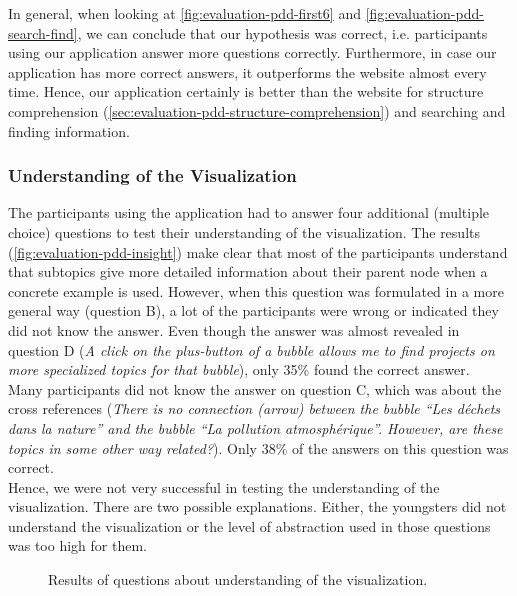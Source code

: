 In general, when looking at \autoref{fig:evaluation-pdd-first6} and \autoref{fig:evaluation-pdd-search-find}, we can conclude that our hypothesis was correct, i.e. participants using our application answer more questions correctly. Furthermore, in case our application has more correct answers, it outperforms the website almost every time. Hence, our application certainly is better than the website for structure comprehension (\autoref{sec:evaluation-pdd-structure-comprehension}) and searching and finding information.

\subsubsection{Understanding of the Visualization}
The participants using the application had to answer four additional (multiple choice) questions to test their understanding of the visualization. The results (\autoref{fig:evaluation-pdd-insight}) make clear that most of the participants understand that subtopics give more detailed information about their parent node when a concrete example is used. However, when this question was formulated in a more general way (question B), a lot of the participants were wrong or indicated they did not know the answer. Even though the answer was almost revealed in question D (\textit{A click on the plus-button of a bubble allows me to find projects on more specialized topics for that bubble}), only 35\% found the correct answer.\\

Many participants did not know the answer on question C, which was about the cross references (\textit{There is no connection (arrow) between the bubble ``Les d\'echets dans la nature'' and the bubble ``La pollution atmosph\'erique''. However, are these topics in some other way related?}). Only 38\% of the answers on this question was correct.\\

Hence, we were not very successful in testing the understanding of the visualization. There are two possible explanations. Either, the youngsters did not understand the visualization or the level of abstraction used in those questions was too high for them.

\begin{figure}[H]
	\centering
	\caption{Results of questions about understanding of the visualization.}
	\label{fig:evaluation-pdd-insight}
\end{figure}




